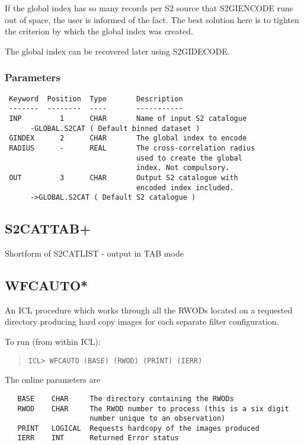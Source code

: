\documentclass{book}
\renewcommand{\_}{{\tt\char'137}}     %
\begin{document}
If the global index has so many records per S2 source that
S2GIENCODE runs out of space, the user is informed of the
fact. The best solution here is to tighten the criterion
by which the global index was created.

The global index can be recovered later using S2GIDECODE.

\subsubsection{Parameters}
\begin{verbatim}
 Keyword  Position  Type       Description
 -------  --------  ----       -----------
 INP         1      CHAR       Name of input S2 catalogue
      -GLOBAL.S2CAT ( Default binned dataset )
 GINDEX      2      CHAR       The global index to encode
 RADIUS      -      REAL       The cross-correlation radius
                               used to create the global
                               index. Not compulsory.
 OUT         3      CHAR       Output S2 catalogue with
                               encoded index included.
      ->GLOBAL.S2CAT ( Default S2 catalogue )

\end{verbatim}\subsection{S2CATTAB+}
Shortform of S2CATLIST - output in TAB mode

\subsection{WFCAUTO*}
An ICL procedure which works through all the RWODs located on a
requested directory producing hard copy images for each separate filter
configuration.

To run (from within ICL):
\begin{quote}\begin{verbatim}
ICL> WFCAUTO (BASE) (RWOD) (PRINT) (IERR)
\end{verbatim}\end{quote}
The online parameters are
\begin{verbatim}
   BASE    CHAR     The directory containing the RWODs
   RWOD    CHAR     The RWOD number to process (this is a six digit
                    number unique to an observation)
   PRINT   LOGICAL  Requests hardcopy of the images produced
   IERR    INT      Returned Error status
\end{verbatim}
\end{document}
